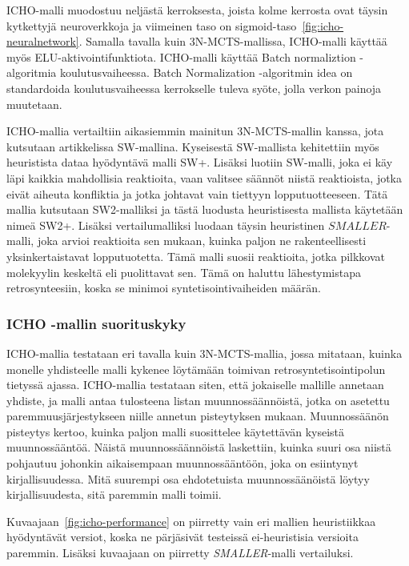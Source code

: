 \documentclass[finnish,twoside,censored,tkt,sw-line]{HYthesisML}
\begin{document}
ICHO-malli muodostuu neljästä kerroksesta, joista kolme kerrosta ovat täysin kytkettyjä neuroverkkoja ja viimeinen taso on sigmoid-taso~\ref{fig:icho-neuralnetwork}.
Samalla tavalla kuin 3N-MCTS-mallissa, ICHO-malli käyttää myös ELU-aktivointifunktiota.
ICHO-malli käyttää Batch normaliztion -algoritmia koulutusvaiheessa.
Batch Normalization -algoritmin idea on standardoida koulutusvaiheessa kerrokselle tuleva syöte, jolla verkon painoja muutetaan.

ICHO-mallia vertailtiin aikasiemmin mainitun 3N-MCTS-mallin kanssa, jota kutsutaan artikkelissa SW-mallina.
Kyseisestä SW-mallista kehitettiin myös heuristista dataa hyödyntävä malli SW+.
Lisäksi luotiin SW-malli, joka ei käy läpi kaikkia mahdollisia reaktioita, vaan valitsee säännöt niistä reaktioista, jotka eivät aiheuta konfliktia ja jotka johtavat vain tiettyyn lopputuotteeseen.
Tätä mallia kutsutaan SW2-malliksi ja tästä luodusta heuristisesta mallista käytetään nimeä SW2+.
Lisäksi vertailumalliksi luodaan täysin heuristinen \(SMALLER\)-malli, joka arvioi reaktioita sen mukaan, kuinka paljon ne rakenteellisesti yksinkertaistavat lopputuotetta.
Tämä malli suosii reaktioita, jotka pilkkovat molekyylin keskeltä eli puolittavat sen.
Tämä on haluttu lähestymistapa retrosynteesiin, koska se minimoi syntetisointivaiheiden määrän.

\subsubsection{ICHO -mallin suorituskyky}

ICHO-mallia testataan eri tavalla kuin 3N-MCTS-mallia, jossa mitataan, kuinka monelle yhdisteelle malli kykenee löytämään toimivan retrosyntetisointipolun tietyssä ajassa.
ICHO-mallia testataan siten, että jokaiselle mallille annetaan yhdiste, ja malli antaa tulosteena listan muunnossäännöistä, jotka on asetettu paremmuusjärjestykseen niille annetun pisteytyksen mukaan.
Muunnossäänön pisteytys kertoo, kuinka paljon malli suosittelee käytettävän kyseistä muunnossääntöä.
Näistä muunnossäännöistä laskettiin, kuinka suuri osa niistä pohjautuu johonkin aikaisempaan muunnossääntöön, joka on esiintynyt kirjallisuudessa.
Mitä suurempi osa ehdotetuista muunnossäänöistä löytyy kirjallisuudesta, sitä paremmin malli toimii.

Kuvaajaan~\ref{fig:icho-performance} on piirretty vain eri mallien heuristiikkaa hyödyntävät versiot, koska ne pärjäsivät testeissä ei-heuristisia versioita paremmin.
Lisäksi kuvaajaan on piirretty \emph{SMALLER}-malli vertailuksi.
\end{document}
